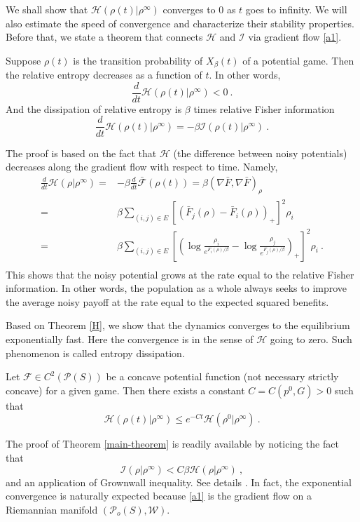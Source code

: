 \documentclass[11pt,reqno]{amsart}
\begin{document}
We shall show that $\mathcal{H}(\rho(t)|\rho^\infty)$ converges to 0 as $t$ goes to infinity. We will also estimate the speed of convergence and characterize their stability properties. Before that, we state a theorem that connects $\mathcal{H}$ and $\mathcal{I}$ via gradient flow \eqref{a1}.
\begin{theorem}\label{H}
Suppose $\rho(t)$ is the transition probability of $X_\beta(t)$ of a potential game.
Then the relative entropy decreases as a function of $t$. In other words, 
\begin{equation*}
\frac{d}{dt}\mathcal{H}(\rho(t)|\rho^\infty)<0\ .
\end{equation*}
And the dissipation of relative entropy is $\beta$ times relative Fisher information  
\begin{equation}\label{Fisher}
\frac{d}{dt}\mathcal{H}(\rho(t)|\rho^\infty)=-\beta\mathcal{I}(\rho(t)|\rho^\infty)\ .
\end{equation}
\end{theorem}
The proof is based on the fact that $\mathcal{H}$ (the difference between noisy potentials) decreases along the gradient flow with respect to time. Namely, 
\begin{equation}\label{lyapunov}
\begin{split}
\frac{d}{dt}\mathcal{H}(\rho|\rho^\infty)=&-\beta\frac{d}{dt}\mathcal{\bar F}(\rho(t))=\beta(\nabla\bar F, \nabla \bar F)_\rho\\
=&\beta\sum_{ (i,j)\in E}[(\bar F_j(\rho)-\bar F_i(\rho))_+]^2\rho_i\\
=&\beta\sum_{ (i,j)\in E}[(\log\frac{\rho_i}{e^{F_i(\rho)/\beta}}-\log \frac{\rho_j}{e^{F_j(\rho)/\beta}} )_+]^2\rho_i\ .\\
\end{split}
\end{equation}
This shows that the noisy potential grows at the rate equal to the relative Fisher information. In other words, the population as a whole always seeks to improve the average noisy payoff at the rate equal to the expected squared benefits.

Based on Theorem \ref{H}, we show that the dynamics converges to the equilibrium exponentially fast. Here the convergence is in the sense of $\mathcal{H}$ going to zero. Such phenomenon is called entropy dissipation.
\begin{theorem}\label{main-theorem}
Let $\mathcal{F}\in C^2(\mathcal{P}(S))$ be a concave potential function (not necessary strictly concave) for a given game. Then there exists a constant $C=C(p^0,G)>0$ such that 
\begin{equation}\label{exp}
\mathcal{H}(\rho(t)|\rho^\infty)\leq e^{-Ct}\mathcal{H}(\rho^0|\rho^\infty)\ .
\end{equation}
\end{theorem}
The proof of Theorem \ref{main-theorem} is readily available by noticing the fact that 
$$\mathcal{I}(\rho|\rho^\infty)< C\beta\mathcal{H}(\rho|\rho^\infty)\ ,$$
and an application of Grownwall inequality. See details \cite{li-thesis, li-theory}. In fact, the exponential convergence is naturally expected because \eqref{a1} is the gradient flow on a Riemannian manifold $(\mathcal{P}_o(S), \mathcal{W})$. 
\end{document}
